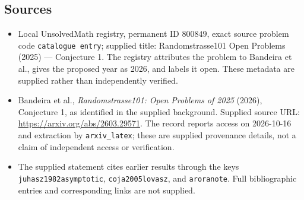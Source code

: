 \documentclass[11pt]{article}
\begin{document}
\subsection{Sources}
\begin{itemize}
\item Local UnsolvedMath registry, permanent ID \(800849\), exact source problem code \texttt{catalogue entry}; supplied title: Randomstrasse101 Open Problems (2025) --- Conjecture 1. The registry attributes the problem to Bandeira et al., gives the proposed year as 2026, and labels it open. These metadata are supplied rather than independently verified.
\item Bandeira et al., \emph{Randomstrasse101: Open Problems of 2025} (2026), Conjecture 1, as identified in the supplied background. Supplied source URL: \url{https://arxiv.org/abs/2603.29571}. The record reports access on 2026-10-16 and extraction by \texttt{arxiv\_latex}; these are supplied provenance details, not a claim of independent access or verification.
\item The supplied statement cites earlier results through the keys \texttt{juhasz1982asymptotic}, \texttt{coja2005lovasz}, and \texttt{aroranote}. Full bibliographic entries and corresponding links are not supplied.
\end{itemize}
\end{document}
